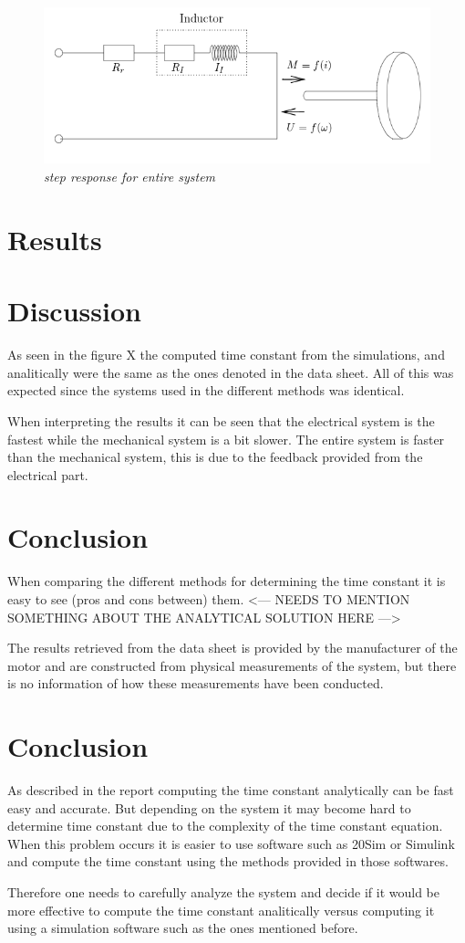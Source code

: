 \documentclass[12pt,a4paper]{article}
\begin{document}
\begin{figure}
  \centering
  \includegraphics[width=.4\linewidth]{schematicdcmotor.png}
  \caption{\emph{step response for entire system}}
  \label{fig:entire}
\end{figure}

\section{Results}


\section{Discussion}
As seen in the figure X the computed time constant from the simulations, and analitically were the same as the ones denoted in the data sheet. All of this was expected since the systems used in the different methods was identical.

When interpreting the results it can be seen that the electrical system is the fastest while the mechanical system is a bit slower. The entire system is faster than the mechanical system, this is due to the feedback provided from the electrical part.

\section{Conclusion}
When comparing the different methods for determining the time constant it is easy to see (pros and cons between) them.
<--- NEEDS TO MENTION SOMETHING ABOUT THE ANALYTICAL SOLUTION HERE --->

The results retrieved from the data sheet is provided by the manufacturer of the motor and are constructed from physical measurements of the system, but there is no information of how these measurements have been conducted.

\section{Conclusion}
As described in the report computing the time constant analytically can be fast easy and accurate. But depending on the system it may become hard to determine time constant due to the complexity of the time constant equation. When this problem occurs it is easier to use software such as 20Sim or Simulink and compute the time constant using the methods provided in those softwares.

Therefore one needs to carefully analyze the system and decide if it would be more effective to compute the time constant analitically versus computing it using a simulation software such as the ones mentioned before.

\begin{thebibliography}{99}

\end{thebibliography}
\end{document}

